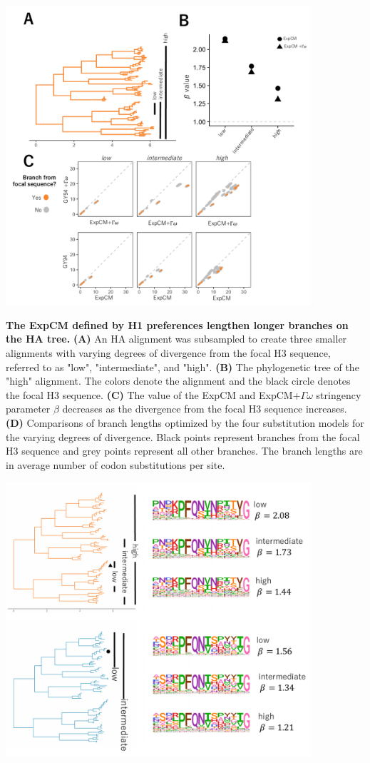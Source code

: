 \documentclass[11pt]{article}
\begin{document}
\begin{suppfig}[H]
\centerline{\includegraphics[width=0.85\textwidth]{figures/lee_compete}}
\caption{\label{supp:lee_compete}
\textbf{The ExpCM defined by H1 preferences lengthen longer branches on the HA tree.} 
\textbf{(A)} An HA alignment was subsampled to create three smaller alignments with varying degrees of divergence from the focal H3 sequence, referred to as "low", "intermediate", and "high". 
\textbf{(B)} The phylogenetic tree of the "high" alignment. 
The colors denote the alignment and the black circle denotes the focal H3 sequence. 
\textbf{(C)} The value of the ExpCM and ExpCM+$\Gamma\omega$ stringency parameter $\beta$ decreases as the divergence from the focal H3 sequence increases. 
\textbf{(D)} Comparisons of branch lengths optimized by the four substitution models for the varying degrees of divergence. 
Black points represent branches from the focal H3 sequence and grey points represent all other branches.  
The branch lengths are in average number of codon substitutions per site. 
}
\end{suppfig}

\begin{suppfig}[H]
\centerline{\includegraphics[width=0.85\textwidth]{figures/compete_4}}
\caption{\label{supp:compete_4}
}
\end{suppfig}


\clearpage 


\end{document}
